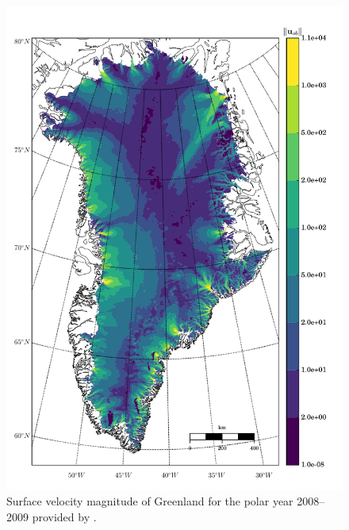 \begin{figure}
  \centering
    \includegraphics[width=0.8\linewidth]{images/balance_velocity/greenland/U_ob.pdf}
  \caption[Greenland surface-velocity magnitude]{Surface velocity magnitude of Greenland for the polar year 2008--2009 provided by \citet{rignot_2012}.}
  \label{greenland_u_ob_image}
\end{figure}


